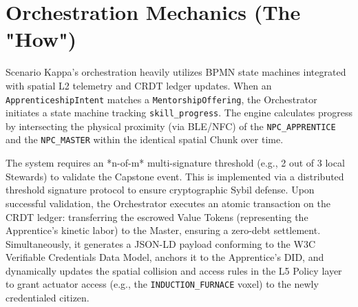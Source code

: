 \section{Orchestration Mechanics (The "How")}
Scenario Kappa's orchestration heavily utilizes BPMN state machines integrated with spatial L2 telemetry and CRDT ledger updates. When an \texttt{ApprenticeshipIntent} matches a \texttt{MentorshipOffering}, the Orchestrator initiates a state machine tracking \texttt{skill\_progress}. The engine calculates progress by intersecting the physical proximity (via BLE/NFC) of the \texttt{NPC\_APPRENTICE} and the \texttt{NPC\_MASTER} within the identical spatial Chunk over time.

The system requires an *n-of-m* multi-signature threshold (e.g., 2 out of 3 local Stewards) to validate the Capstone event. This is implemented via a distributed threshold signature protocol to ensure cryptographic Sybil defense. Upon successful validation, the Orchestrator executes an atomic transaction on the CRDT ledger: transferring the escrowed Value Tokens (representing the Apprentice's kinetic labor) to the Master, ensuring a zero-debt settlement. Simultaneously, it generates a JSON-LD payload conforming to the W3C Verifiable Credentials Data Model, anchors it to the Apprentice's DID, and dynamically updates the spatial collision and access rules in the L5 Policy layer to grant actuator access (e.g., the \texttt{INDUCTION\_FURNACE} voxel) to the newly credentialed citizen.
